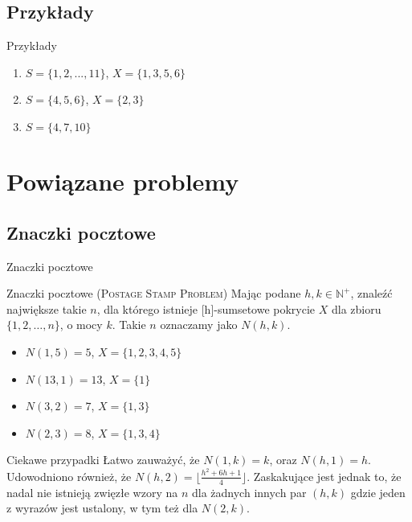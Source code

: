 \documentclass{beamer}
\newcommand{\N}{\mathbb{N}}
\begin{document}
	\subsection{Przykłady}
		\begin{frame}{Przykłady}
			\begin{enumerate}
				\item $ S = \lbrace 1,2,...,11 \rbrace $, $ X = \lbrace 1,3,5,6 \rbrace $
				\pause \item $ S = \lbrace 4,5,6 \rbrace $, $ X = \lbrace 2,3 \rbrace $
				\pause \item $ S =  \lbrace 4,7,10 \rbrace $
			\end{enumerate}						
		\end{frame}
		
\section{Powiązane problemy}
	\subsection{Znaczki pocztowe}
		\begin{frame}{Znaczki pocztowe}
			\begin{block}{Znaczki pocztowe (\rmfamily \textsc{Postage Stamp Problem})}
                Mając podane $ h, k \in \N^{+} $, znaleźć największe takie $ n $, dla którego istnieje [h]-sumsetowe pokrycie $ X $ dla zbioru $ \lbrace 1, 2, \dots , n \rbrace $, o mocy $ k $. Takie $ n $ oznaczamy jako $ N(h,k) $.
                \begin{itemize}
				    \pause \item $ N(1,5) = 5 $, $ X = \lbrace 1, 2, 3, 4, 5 \rbrace $
				    \pause \item $ N(13,1) = 13 $, $ X = \lbrace 1 \rbrace $
				    \pause \item $ N(3,2) = 7 $, $ X = \lbrace 1, 3 \rbrace $
				    \pause \item $ N(2,3) = 8 $, $ X = \lbrace 1, 3, 4 \rbrace $
                    \pause
                \end{itemize}
            \end{block}
            \begin{block}{Ciekawe przypadki}
                Łatwo zauważyć, że $ N(1,k) = k $, oraz  $ N(h,1) = h $.
                Udowodniono również, że $ N(h,2) = \lfloor \frac{h^2 + 6h + 1}{4} \rfloor $.
                Zaskakujące jest jednak to, że nadal nie istnieją zwięzłe wzory na $ n $ dla żadnych innych par $ (h,k) $ gdzie jeden z wyrazów jest ustalony, w tym też dla $ N(2,k) $.
			\end{block}
		\end{frame}
		
\end{document}
